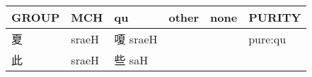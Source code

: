\documentclass[14pt,a4paper]{scrartcl}
\begin{document}
\begin{longtable}[c]{@{}llllll@{}}
\toprule
\begin{minipage}[b]{0.14\columnwidth}\raggedright\strut
GROUP
\strut\end{minipage} &
\begin{minipage}[b]{0.14\columnwidth}\raggedright\strut
MCH
\strut\end{minipage} &
\begin{minipage}[b]{0.14\columnwidth}\raggedright\strut
qu
\strut\end{minipage} &
\begin{minipage}[b]{0.14\columnwidth}\raggedright\strut
other
\strut\end{minipage} &
\begin{minipage}[b]{0.14\columnwidth}\raggedright\strut
none
\strut\end{minipage} &
\begin{minipage}[b]{0.14\columnwidth}\raggedright\strut
PURITY
\strut\end{minipage}\tabularnewline
\midrule
\endhead
\begin{minipage}[t]{0.14\columnwidth}\raggedright\strut
夏
\strut\end{minipage} &
\begin{minipage}[t]{0.14\columnwidth}\raggedright\strut
sraeH
\strut\end{minipage} &
\begin{minipage}[t]{0.14\columnwidth}\raggedright\strut
嗄 sraeH
\strut\end{minipage} &
\begin{minipage}[t]{0.14\columnwidth}\raggedright\strut
\strut\end{minipage} &
\begin{minipage}[t]{0.14\columnwidth}\raggedright\strut
\strut\end{minipage} &
\begin{minipage}[t]{0.14\columnwidth}\raggedright\strut
pure:qu
\strut\end{minipage}\tabularnewline
\begin{minipage}[t]{0.14\columnwidth}\raggedright\strut
此
\strut\end{minipage} &
\begin{minipage}[t]{0.14\columnwidth}\raggedright\strut
sraeH
\strut\end{minipage} &
\begin{minipage}[t]{0.14\columnwidth}\raggedright\strut
些 saH
\strut\end{minipage} &
\begin{minipage}[t]{0.14\columnwidth}\raggedright\strut

\end{minipage}
\end{longtable}
\end{document}
